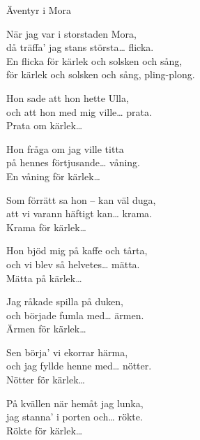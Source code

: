\begin{song}{Äventyr i Mora}
	
	
	

    \showversenumber	
	När jag var i storstaden Mora,\\
	då träffa' jag stans största\ldots{} flicka.\\
	En flicka för kärlek och solsken och sång,\\
	för kärlek och solsken och sång, pling-plong.
	
    \showversenumber
	Hon sade att hon hette Ulla,\\
	och att hon med mig ville\ldots{} prata.\\
	Prata om kärlek\ldots{}
	
    \showversenumber
	Hon fråga om jag ville titta\\
	på hennes förtjusande\ldots{} våning.\\
	En våning för kärlek\ldots{}
	
    \showversenumber
	Som förrätt sa hon -- kan väl duga,\\
	att vi varann häftigt kan\ldots{} krama.\\
	Krama för kärlek\ldots{}
	
    \showversenumber
	Hon bjöd mig på kaffe och tårta,\\
	och vi blev så helvetes\ldots{} mätta.\\
	Mätta på kärlek\ldots{}
	
    \showversenumber
	Jag råkade spilla på duken,\\
	och började fumla med\ldots{} ärmen.\\
	Ärmen för kärlek\ldots{}
	
    \showversenumber
	Sen börja' vi ekorrar härma,\\
	och jag fyllde henne med\ldots{} nötter.\\
	Nötter för kärlek\ldots{}
	
    \showversenumber
	På kvällen när hemåt jag lunka,\\
	jag stanna' i porten och\ldots{} rökte.\\
	Rökte för kärlek\ldots{}
	
\end{song}
